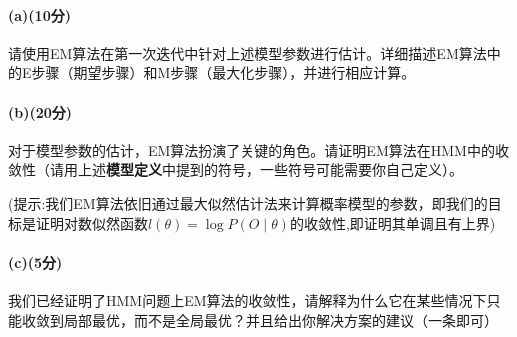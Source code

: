 \documentclass[12pt,a4paper]{article}%
\begin{document}
\paragraph*{(a)(10分)} 请使用EM算法在第一次迭代中针对上述模型参数进行估计。详细描述EM算法中的E步骤（期望步骤）和M步骤（最大化步骤），并进行相应计算。 

\paragraph*{(b)(20分)} 对于模型参数的估计，EM算法扮演了关键的角色。请证明EM算法在HMM中的收敛性（请用上述\textbf{模型定义}中提到的符号，一些符号可能需要你自己定义）。

(提示:我们EM算法依旧通过最大似然估计法来计算概率模型的参数，即我们的目标是证明对数似然函数$l(\theta)=\log P(O \mid \theta)$的收敛性,即证明其单调且有上界)

\paragraph*{(c)(5分)} 我们已经证明了HMM问题上EM算法的收敛性，请解释为什么它在某些情况下只能收敛到局部最优，而不是全局最优？并且给出你解决方案的建议（一条即可）
\end{document}

